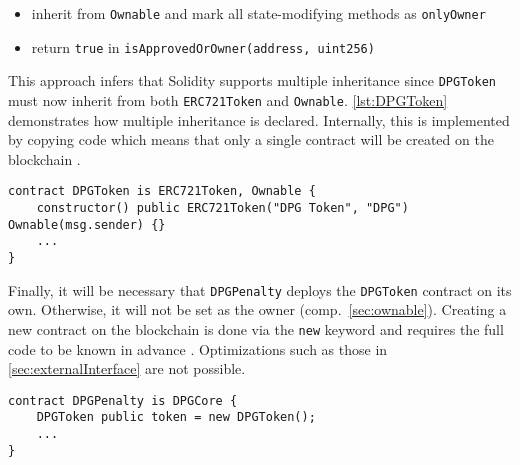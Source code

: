 \begin{itemize}
  \item inherit from \texttt{Ownable} and mark all state-modifying methods as \texttt{onlyOwner}
  \item return \texttt{true} in \texttt{isApprovedOrOwner(address, uint256)}
\end{itemize}

This approach infers that Solidity supports multiple inheritance since \texttt{DPGToken} must now inherit from both \texttt{ERC721Token} and \texttt{Ownable}. \autoref{lst:DPGToken} demonstrates how multiple inheritance is declared. Internally, this is implemented by copying code which means that only a single contract will be created on the blockchain \cite[p.~88]{solidityDocs}. 

\begin{lstlisting}[language=Solidity, caption=Multiple inheritance by DPGToken, label=lst:DPGToken]
contract DPGToken is ERC721Token, Ownable {
	constructor() public ERC721Token("DPG Token", "DPG") Ownable(msg.sender) {}
	...
}
\end{lstlisting}

Finally, it will be necessary that \texttt{DPGPenalty} deploys the \texttt{DPGToken} contract on its own. Otherwise, it will not be set as the owner (comp.~\ref{sec:ownable}). Creating a new contract on the blockchain is done via the \texttt{new} keyword and requires the full code to be known in advance \cite[p.~71]{solidityDocs}. Optimizations such as those in \autoref{sec:externalInterface} are not possible. 

\begin{lstlisting}[language=Solidity, caption=Creating a contract from a contract, label=lst:DPGTokenCreation]
contract DPGPenalty is DPGCore {
	DPGToken public token = new DPGToken();
	...
}
\end{lstlisting}



